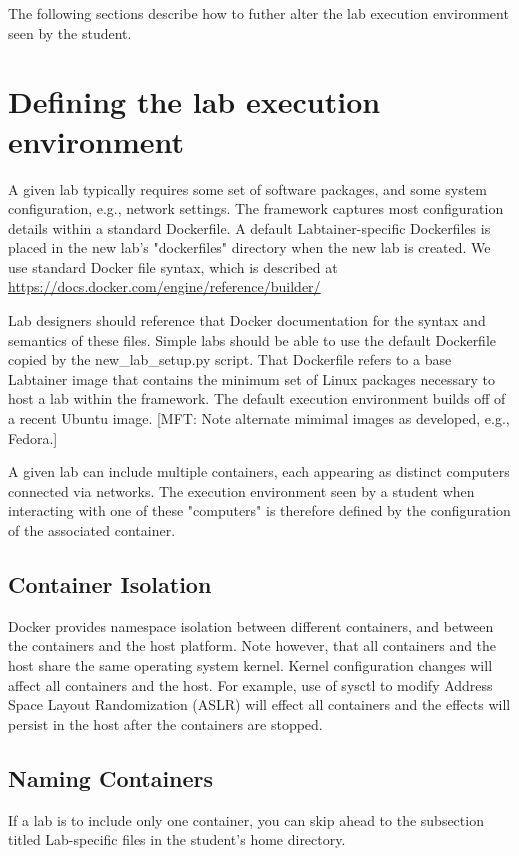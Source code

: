 \documentclass{article}
\begin{document}
The following sections describe how to futher alter the lab execution environment seen by 
the student.

\section {Defining the lab execution environment}
A given lab typically requires some set of software packages, and some
system configuration, e.g., network settings.  
The framework captures most configuration details within a standard
Dockerfile.  A default Labtainer-specific Dockerfiles is placed in the new lab's "dockerfiles" 
directory when the new lab is created.  We use standard Docker file syntax, which is described at 
\url{https://docs.docker.com/engine/reference/builder/}

Lab designers should reference that Docker documentation for the 
syntax and semantics of these files.
Simple labs should be able to use the default Dockerfile copied by the 
new\_lab\_setup.py script.  That Dockerfile refers to a base Labtainer
image that contains the minimum set of Linux packages necessary to 
host a lab within the framework.  The default
execution environment builds off of a recent Ubuntu image.
[MFT: Note alternate mimimal images as developed, e.g., Fedora.]

A given lab can include multiple containers, each appearing as distinct
computers connected via networks.  The execution environment seen by a
student when interacting with one of these "computers" is therefore defined
by the configuration of the associated container.  

\subsection {Container Isolation}
Docker provides namespace isolation between different containers, and
between the containers and the host platform.  Note however, that all
containers and the host share the same operating system kernel.  Kernel
configuration changes will affect all containers and the host.  For example,
use of sysctl to modify Address Space Layout Randomization (ASLR) will effect
all containers and the effects will persist in the host after the containers
are stopped.

\subsection {Naming Containers}
If a lab is to include only one container, you can
skip ahead to the subsection titled Lab-specific files in the student's home directory.
\end{document}
